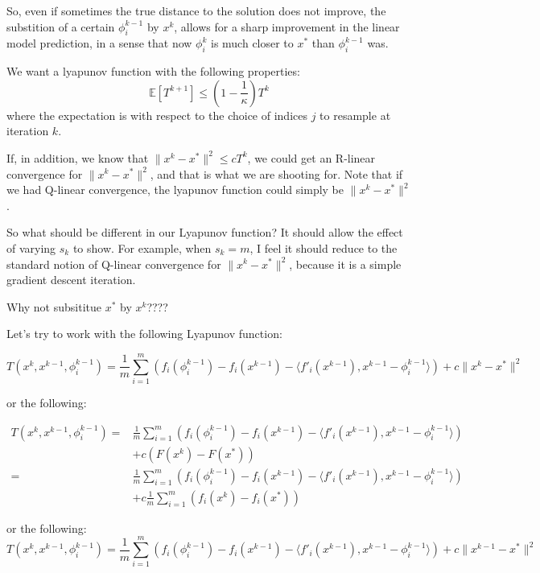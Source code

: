 \documentclass[11pt]{article}
\begin{document}
So, even if sometimes the true distance to the solution does not improve, the substition of a certain $\phi^{k-1}_i$ by $x^k$, allows for a sharp improvement in the linear model prediction, in a sense that now  $\phi^{k}_i$ is much closer to  $x^*$ than  $\phi^{k-1}_i$ was. 

We want a lyapunov function with the following properties:
\begin{equation}
	\mathbb{E}\left[ T^{k+1} \right] \leq \left(1-\frac{1}{\kappa} \right) T^k
\end{equation}
where the expectation is with respect to the choice of indices $j$ to resample at iteration $k$.

If, in addition, we know that $\|x^k - x^*\|^2 \leq c T^k$, we could get an R-linear convergence for $\|x^k - x^*\|^2$, and that is what we are shooting for. Note that if we had Q-linear convergence, the lyapunov function could simply be $\|x^k - x^*\|^2$.

So what should be different in our Lyapunov function? It should allow the effect of varying $s_k$ to show. For example, when $s_k=m$, I feel it should reduce to the standard notion of Q-linear convergence for $\|x^k - x^*\|^2$, because it is a simple gradient descent iteration. 

Why not subsititue $x^*$ by $x^k$????

Let's try to work with the following Lyapunov function:


 \begin{equation}
	 T(x^k, x^{k-1}, \phi_i^{k-1}) = \frac{1}{m}\sum_{i =1}^{m} \left( f_i(\phi_i^{k-1}) -  f_i(x^{k-1}) - \langle f'_i(x^{k-1}), x^{k-1} -\phi_i^{k-1} \rangle  \right) + c \|x^k - x^* \|^2 
 \end{equation}
 
 or the following:

 \begin{align*}
	 T(x^k, x^{k-1}, \phi_i^{k-1}) =& \frac{1}{m}\sum_{i =1}^{m} \left( f_i(\phi_i^{k-1}) -  f_i(x^{k-1}) - \langle f'_i(x^{k-1}), x^{k-1} -\phi_i^{k-1} \rangle  \right) \\
	 &+ c (F(x^k) -  F(x^*))\\
	 =& \frac{1}{m}\sum_{i =1}^{m} \left( f_i(\phi_i^{k-1}) -  f_i(x^{k-1}) - \langle f'_i(x^{k-1}), x^{k-1} -\phi_i^{k-1} \rangle  \right) \\
	 	 &+ c \frac{1}{m}\sum_{i =1}^{m} (f_i(x^k) -  f_i(x^*))
 \end{align*}
 
 or the following:
 \begin{equation}
	 T(x^k, x^{k-1}, \phi_i^{k-1}) = \frac{1}{m}\sum_{i =1}^{m} \left( f_i(\phi_i^{k-1}) -  f_i(x^{k-1}) - \langle f'_i(x^{k-1}), x^{k-1} -\phi_i^{k-1} \rangle  \right) + c \|x^{k-1} - x^* \|^2 
 \end{equation}
 
\end{document}

